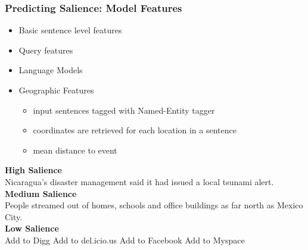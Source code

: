 \documentclass{beamer}
\begin{document}
\begin{frame}
\frametitle{Predicting Salience: Model Features}
\begin{itemize}
\item Basic sentence level features
\item Query features
\item Language Models
\item Geographic Features
\begin{itemize}
\item input sentences tagged with Named-Entity tagger
\item coordinates are retrieved for each location in a sentence
\item mean distance to event
\end{itemize}
\end{itemize}

\pause
\textbf{High Salience}\\ 
\alert<2>{Nicaragua's} disaster management said it had issued a local tsunami alert.\\
\textbf{Medium Salience} \\
People streamed out of homes, schools and office buildings as far north as \alert<2>{Mexico City.}\\
\textbf{Low Salience} \\
Add to Digg Add to del.icio.us Add to Facebook Add to Myspace 



\end{frame}
\end{document}
